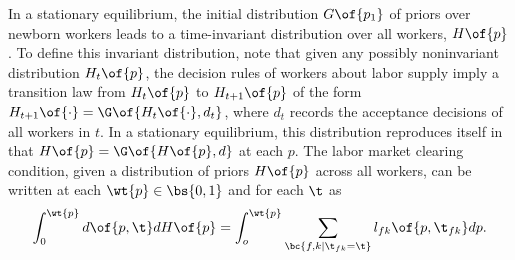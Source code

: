 \documentclass[12pt]{article}
\newcommand{\CiteReference}{../reference.bib}
\theoremstyle{definition}
\begin{document}
In a stationary equilibrium, the initial distribution $G\of{p_1}$ of priors over newborn workers leads to a time-invariant distribution over all workers, $H\of{p}$. To define this invariant distribution, note that given any possibly noninvariant distribution $H_t\of{p}$, the decision rules of workers about labor supply imply a transition law from $H_t\of{p}$ to $H_{t+1}\of{p}$ of the form $H_{t+1}\of{\cdot} = \G\of{H_t\of{\cdot}, d_t}$, where $d_t$ records the acceptance decisions of all workers in $t$. In a stationary equilibrium, this distribution reproduces itself in that $H\of{p} = \G\of{H\of{p}, d}$ at each $p$. The labor market clearing condition, given a distribution of priors $H\of{p}$ across all workers, can be written at each $\wt{p} \in \bs{0, 1}$ and for each $\t$ as 
\begin{equation}
    \label{8}
    \int_0^{\wt{p}} d\of{p, \t} dH\of{p} = \int_o^{\wt{p}} \sum_{\bc{f, k \mid \t_{fk}=\t}} l_{fk}\of{p, \t_{fk}} dp. 
\end{equation}








\end{document}

